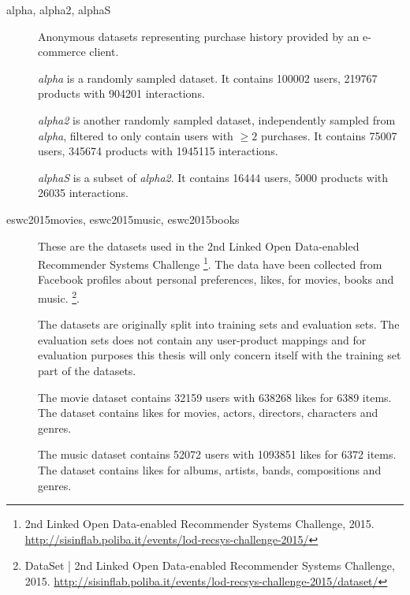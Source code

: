 \begin{description}
    \item[alpha, alpha2, alphaS] \hfill

        Anonymous datasets representing purchase history provided by an e-commerce client.

        \textit{alpha} is a randomly sampled dataset. It contains 100002 users, 219767 products with 904201 interactions.

        \textit{alpha2} is another randomly sampled dataset, independently sampled from \textit{alpha}, filtered to only contain users with $\geq 2$ purchases. It contains 75007 users, 345674 products with 1945115 interactions.

        \textit{alphaS} is a subset of \textit{alpha2}. It contains 16444 users, 5000 products with 26035 interactions.




    \item[eswc2015movies, eswc2015music, eswc2015books] \hfill

        These are the datasets used in the 2nd Linked Open Data-enabled Recommender Systems Challenge
        \footnote{2nd Linked Open Data-enabled Recommender Systems Challenge, 2015. \url{http://sisinflab.poliba.it/events/lod-recsys-challenge-2015/}}.
        The data have been collected from Facebook profiles about personal preferences, likes, for movies, books and music.
        \footnote{DataSet | 2nd Linked Open Data-enabled Recommender Systems Challenge, 2015. \url{http://sisinflab.poliba.it/events/lod-recsys-challenge-2015/dataset/}}.

        The datasets are originally split into training sets and evaluation sets. The evaluation sets does not contain any user-product mappings and for evaluation purposes this thesis will only concern itself with the training set part of the datasets.

        The movie dataset contains 32159 users with 638268 likes for 6389 items. The dataset contains likes for movies, actors, directors, characters and genres.

        The music dataset contains 52072 users with 1093851 likes for 6372 items. The dataset contains likes for albums, artists, bands, compositions and genres.


\end{description}
